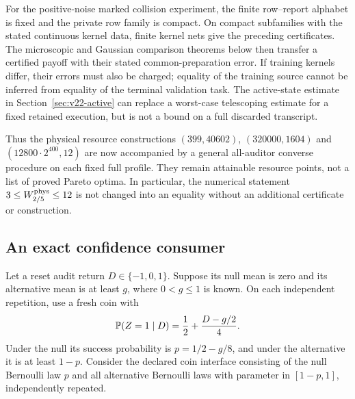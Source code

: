 For the positive-noise marked collision experiment, the finite
row--report alphabet is fixed and the private row family is compact.
On compact subfamilies with the stated continuous kernel data, finite
kernel nets give the preceding certificates. The microscopic and
Gaussian comparison theorems below then transfer a certified payoff
with their stated common-preparation error. If training kernels differ,
their errors must also be charged; equality of the training source
cannot be inferred from equality of the terminal validation task.
The active-state estimate in Section~\ref{sec:v22-active} can replace
a worst-case telescoping estimate for a fixed retained execution, but
is not a bound on a full discarded transcript.

Thus the physical resource constructions $(399,40602)$,
$(320000,1604)$ and $(12800\cdot2^{400},12)$ are now accompanied by a
general all-auditor converse procedure on each fixed full profile.
They remain attainable resource points, not a list of proved Pareto
optima. In particular, the numerical statement
$3\le W_{2/5}^{\rm phys}\le12$ is not changed into an equality without
an additional certificate or construction.

\subsection{An exact confidence consumer}
Let a reset audit return $D\in\{-1,0,1\}$. Suppose its null mean is
zero and its alternative mean is at least $g$, where $0<g\le1$ is
known. On each independent repetition, use a fresh coin with
\begin{equation}\label{eq:v23-consumer-coin}
 \mathbb P(Z=1\mid D)=\frac12+\frac{D-g/2}{4}.
\end{equation}
Under the null its success probability is $p=1/2-g/8$, and under the
alternative it is at least $1-p$. Consider the declared coin interface
consisting of the null Bernoulli law $p$ and all alternative Bernoulli
laws with parameter in $[1-p,1]$, independently repeated.

